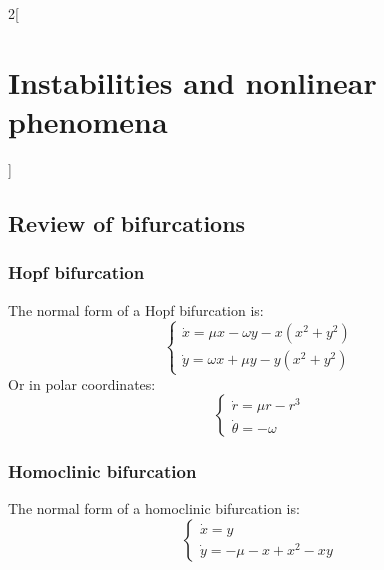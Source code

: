 \documentclass[../../../main_math.tex]{subfiles}
\begin{document}
\begin{multicols}{2}[\section{Instabilities and nonlinear phenomena}]
  \subsection{Review of bifurcations}
  \subsubsection{Hopf bifurcation}
  \begin{definition}
    The normal form of a Hopf bifurcation is:
    \begin{equation*}
      \begin{cases}
        \dot{x}=\mu x-\omega y-x(x^2+y^2) \\
        \dot{y}=\omega x+\mu y-y(x^2+y^2)
      \end{cases}
    \end{equation*}
    Or in polar coordinates:
    \begin{equation*}
      \begin{cases}
        \dot{r}=\mu r-r^3 \\
        \dot{\theta}=-\omega
      \end{cases}
    \end{equation*}
  \end{definition}
  \subsubsection{Homoclinic bifurcation}
  \begin{definition}
    The normal form of a homoclinic bifurcation is:
    \begin{equation*}
      \begin{cases}
        \dot{x}=y \\
        \dot{y}=-\mu- x+x^2-xy
      \end{cases}
    \end{equation*}
  \end{definition}
\end{multicols}
\end{document}

